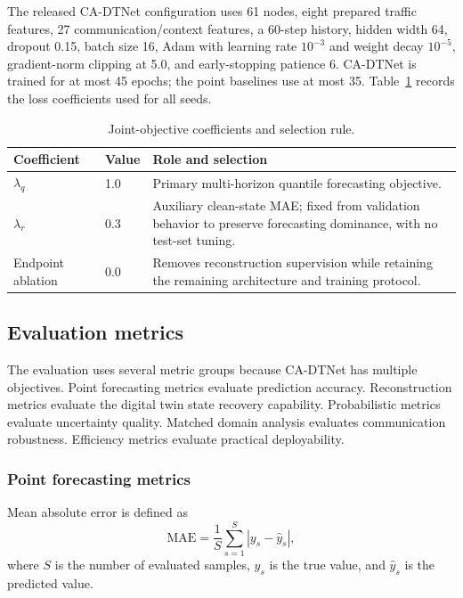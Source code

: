 \documentclass[pdflatex,sn-mathphys-num]{sn-jnl}%
\newenvironment{changed}{\color{blue}}{}
\theoremstyle{thmstyleone}%
\theoremstyle{thmstyletwo}%
\theoremstyle{thmstylethree}%
\begin{document}
\begin{changed}
The released CA-DTNet configuration uses 61 nodes, eight prepared traffic features, 27 communication/context features, a 60-step history, hidden width 64, dropout 0.15, batch size 16, Adam with learning rate \(10^{-3}\) and weight decay \(10^{-5}\), gradient-norm clipping at 5.0, and early-stopping patience 6. CA-DTNet is trained for at most 45 epochs; the point baselines use at most 35. Table~\ref{tab:loss_weights} records the loss coefficients used for all seeds.

\begin{table}[!htbp]
\caption{Joint-objective coefficients and selection rule.}
\label{tab:loss_weights}
\centering
\small
\begin{tabular}{p{2.7cm}p{1.7cm}p{7.0cm}}
\toprule
Coefficient & Value & Role and selection \\
\midrule
\(\lambda_q\) & 1.0 & Primary multi-horizon quantile forecasting objective. \\
\(\lambda_r\) & 0.3 & Auxiliary clean-state MAE; fixed from validation behavior to preserve forecasting dominance, with no test-set tuning. \\
Endpoint ablation & 0.0 & Removes reconstruction supervision while retaining the remaining architecture and training protocol. \\
\bottomrule
\end{tabular}
\end{table}
\end{changed}

\subsection{Evaluation metrics}
\label{subsec:evaluation_metrics}

The evaluation uses several metric groups because CA-DTNet has multiple objectives. Point forecasting metrics evaluate prediction accuracy. Reconstruction metrics evaluate the digital twin state recovery capability. Probabilistic metrics evaluate uncertainty quality. Matched domain analysis evaluates communication robustness. Efficiency metrics evaluate practical deployability.

\subsubsection{Point forecasting metrics}

Mean absolute error is defined as
\begin{equation}
    \mathrm{MAE}
    =
    \frac{1}{S}
    \sum_{s=1}^{S}
    \left|
    y_s - \widehat{y}_s
    \right|,
\end{equation}
where \(S\) is the number of evaluated samples, \(y_s\) is the true value, and \(\widehat{y}_s\) is the predicted value.
\end{document}
